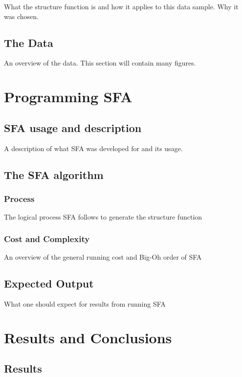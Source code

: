 \documentclass[12pt, oneside]{smuthesis}
\begin{document}
\citep{collier2001}
\citep{test1}
\citep{test2}
What the structure function is and how it applies to this data sample. Why it was chosen.

\section{\sc The Data}

An overview of the data. This section will contain many figures.

\chapter{\sc Programming SFA}

\section{\sc SFA usage and description}

A description of what SFA was developed for and its usage.

\section{\sc The SFA algorithm}

\subsection{\sc Process}

The logical process SFA follows to generate the structure function

\subsection{\sc Cost and Complexity}

An overview of the general running cost and Big-Oh order of SFA

\section{\sc Expected Output}

What one should expect for results from running SFA

\chapter{\sc Results and Conclusions}

\section{\sc Results}
\end{document}
